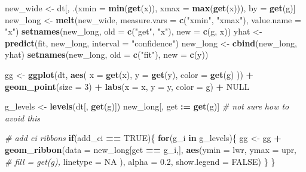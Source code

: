 \documentclass[]{book}
\newenvironment{Shaded}{\begin{snugshade}}{\end{snugshade}}
\newcommand{\CommentTok}[1]{\textcolor[rgb]{0.56,0.35,0.01}{\textit{#1}}}
\newcommand{\ControlFlowTok}[1]{\textcolor[rgb]{0.13,0.29,0.53}{\textbf{#1}}}
\newcommand{\DataTypeTok}[1]{\textcolor[rgb]{0.13,0.29,0.53}{#1}}
\newcommand{\DecValTok}[1]{\textcolor[rgb]{0.00,0.00,0.81}{#1}}
\newcommand{\ErrorTok}[1]{\textcolor[rgb]{0.64,0.00,0.00}{\textbf{#1}}}
\newcommand{\FloatTok}[1]{\textcolor[rgb]{0.00,0.00,0.81}{#1}}
\newcommand{\KeywordTok}[1]{\textcolor[rgb]{0.13,0.29,0.53}{\textbf{#1}}}
\newcommand{\NormalTok}[1]{#1}
\newcommand{\OperatorTok}[1]{\textcolor[rgb]{0.81,0.36,0.00}{\textbf{#1}}}
\newcommand{\OtherTok}[1]{\textcolor[rgb]{0.56,0.35,0.01}{#1}}
\newcommand{\StringTok}[1]{\textcolor[rgb]{0.31,0.60,0.02}{#1}}
\begin{document}
\begin{Shaded}
\begin{Highlighting}[]
\NormalTok{  new_wide <-}\StringTok{ }\NormalTok{dt[, .(}\DataTypeTok{xmin =} \KeywordTok{min}\NormalTok{(}\KeywordTok{get}\NormalTok{(x)), }\DataTypeTok{xmax =} \KeywordTok{max}\NormalTok{(}\KeywordTok{get}\NormalTok{(x))), by =}\StringTok{ }\KeywordTok{get}\NormalTok{(g)]}
\NormalTok{  new_long <-}\StringTok{ }\KeywordTok{melt}\NormalTok{(new_wide,}
                   \DataTypeTok{measure.vars =} \KeywordTok{c}\NormalTok{(}\StringTok{"xmin"}\NormalTok{, }\StringTok{"xmax"}\NormalTok{),}
                   \DataTypeTok{value.name =} \StringTok{"x"}\NormalTok{)}
  \KeywordTok{setnames}\NormalTok{(new_long, }\DataTypeTok{old =} \KeywordTok{c}\NormalTok{(}\StringTok{"get"}\NormalTok{, }\StringTok{"x"}\NormalTok{), }\DataTypeTok{new =} \KeywordTok{c}\NormalTok{(g, x))}
\NormalTok{  yhat <-}\StringTok{ }\KeywordTok{predict}\NormalTok{(fit,}
\NormalTok{                  new_long,}
                  \DataTypeTok{interval =} \StringTok{"confidence"}\NormalTok{)}
\NormalTok{  new_long <-}\StringTok{ }\KeywordTok{cbind}\NormalTok{(new_long, yhat)}
  \KeywordTok{setnames}\NormalTok{(new_long, }\DataTypeTok{old =} \KeywordTok{c}\NormalTok{(}\StringTok{"fit"}\NormalTok{), }\DataTypeTok{new =} \KeywordTok{c}\NormalTok{(y))}
  
\NormalTok{  gg <-}\StringTok{ }\KeywordTok{ggplot}\NormalTok{(dt, }\KeywordTok{aes}\NormalTok{(}
    \DataTypeTok{x =} \KeywordTok{get}\NormalTok{(x),}
    \DataTypeTok{y =} \KeywordTok{get}\NormalTok{(y),}
    \DataTypeTok{color =} \KeywordTok{get}\NormalTok{(g)}
\NormalTok{  )) }\OperatorTok{+}
\StringTok{    }
\StringTok{    }\KeywordTok{geom_point}\NormalTok{(}\DataTypeTok{size =} \DecValTok{3}\NormalTok{) }\OperatorTok{+}
\StringTok{    }\KeywordTok{labs}\NormalTok{(}\DataTypeTok{x =}\NormalTok{ x,}
         \DataTypeTok{y =}\NormalTok{ y,}
         \DataTypeTok{color =}\NormalTok{ g) }\OperatorTok{+}
\StringTok{    }\OtherTok{NULL}
  
\NormalTok{  g_levels <-}\StringTok{ }\KeywordTok{levels}\NormalTok{(dt[, }\KeywordTok{get}\NormalTok{(g)])}
\NormalTok{  new_long[, get }\OperatorTok{:}\ErrorTok{=}\StringTok{ }\KeywordTok{get}\NormalTok{(g)] }\CommentTok{# not sure how to avoid this}
  
  \CommentTok{# add ci ribbons}
  \ControlFlowTok{if}\NormalTok{(add_ci }\OperatorTok{==}\StringTok{ }\OtherTok{TRUE}\NormalTok{)\{}
    \ControlFlowTok{for}\NormalTok{(g_i }\ControlFlowTok{in}\NormalTok{ g_levels)\{}
\NormalTok{      gg <-}\StringTok{ }\NormalTok{gg }\OperatorTok{+}
\StringTok{        }\KeywordTok{geom_ribbon}\NormalTok{(}\DataTypeTok{data =}\NormalTok{ new_long[get }\OperatorTok{==}\StringTok{ }\NormalTok{g_i,],}
                    \KeywordTok{aes}\NormalTok{(}\DataTypeTok{ymin =}\NormalTok{ lwr,}
                        \DataTypeTok{ymax =}\NormalTok{ upr,}
                        \CommentTok{#                     fill = get(g),}
                        \DataTypeTok{linetype =} \OtherTok{NA}
\NormalTok{                    ),}
                    \DataTypeTok{alpha =} \FloatTok{0.2}\NormalTok{,}
                    \DataTypeTok{show.legend =} \OtherTok{FALSE}\NormalTok{)}
\NormalTok{    \}}
\NormalTok{  \}}
  

\end{Highlighting}
\end{Shaded}
\end{document}
